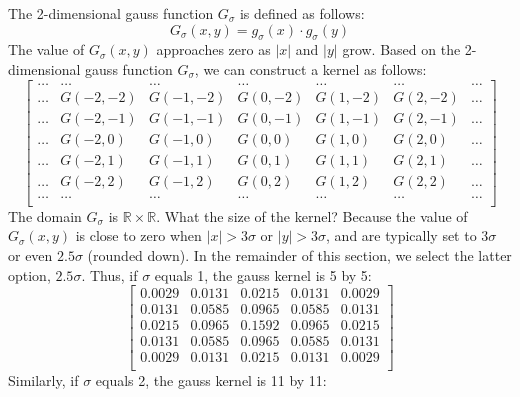 \documentclass{book}
\begin{document}
The 2-dimensional gauss function $G_\sigma$ is defined as follows:
$$G_\sigma(x, y) = g_\sigma(x) \cdot g_\sigma(y)$$
The value of $G_\sigma(x, y)$ approaches zero as $|x|$ and $|y|$ grow. Based on the 2-dimensional gauss function $G_\sigma$, we can construct a kernel as follows:
$$
\begin{bmatrix}
\dots & \dots & \dots & \dots & \dots & \dots & \dots\\
\dots & G(-2, -2) & G(-1, -2) & G(0, -2) & G(1, -2) & G(2, -2) & \dots\\
\dots & G(-2, -1) & G(-1, -1) & G(0, -1) & G(1, -1) & G(2, -1) & \dots\\
\dots & G(-2, 0) & G(-1, 0) & G(0, 0) & G(1, 0) & G(2, 0) & \dots\\
\dots & G(-2, 1) & G(-1, 1) & G(0, 1) & G(1, 1) & G(2, 1) & \dots\\
\dots & G(-2, 2) & G(-1, 2) & G(0, 2) & G(1, 2) & G(2, 2) & \dots\\
\dots & \dots & \dots & \dots & \dots & \dots & \dots\\
\end{bmatrix}
$$
The domain $G_\sigma$ is $\mathbb{R} \times \mathbb{R}$. What the size of the kernel? Because the value of $G_\sigma(x, y)$ is close to zero when $|x| > 3\sigma$ or $|y| > 3\sigma$,  and  are typically set to $3\sigma$ or even $2.5\sigma$ (rounded down). In the remainder of this section, we select the latter option, $2.5\sigma$. Thus, if $\sigma$ equals 1, the gauss kernel is 5 by 5:
$$
\begin{bmatrix}
0.0029 & 0.0131 & 0.0215 & 0.0131 & 0.0029\\
0.0131 & 0.0585 & 0.0965 & 0.0585 & 0.0131\\
0.0215 & 0.0965 & 0.1592 & 0.0965 & 0.0215\\
0.0131 & 0.0585 & 0.0965 & 0.0585 & 0.0131\\
0.0029 & 0.0131 & 0.0215 & 0.0131 & 0.0029\\
\end{bmatrix}
$$
Similarly, if $\sigma$ equals 2, the gauss kernel is 11 by 11:
\end{document}
